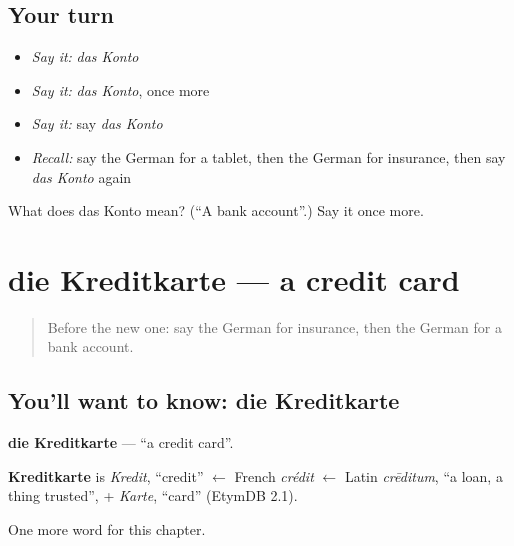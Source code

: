 \subsection*{Your turn}
\begin{itemize}
\raggedright
  \item \emph{Say it:} \emph{das Konto}
  \item \emph{Say it:} \emph{das Konto}, once more
  \item \emph{Say it:} say \emph{das Konto}
  \item \emph{Recall:} say the German for a tablet, then the German for insurance, then say \emph{das Konto} again
\end{itemize}

\begin{tcolorbox}[breakable,colback=teal!4,colframe=teal!35!black,title={Before you move on}]
What does das Konto mean? (\textquotedblleft{}A bank account\textquotedblright{}.) Say it once more.
\end{tcolorbox}
\section[die Kreditkarte]{die Kreditkarte — a credit card}

\label{lesson:GE-C157-kreditkarte}



\begin{quote}
Before the new one: say the German for insurance, then the German for a bank account.
\end{quote}

\subsection*{You'll want to know: die Kreditkarte}
\textbf{die Kreditkarte} — \textquotedblleft{}a credit card\textquotedblright{}.

\begin{cousinweb}
\textbf{Kreditkarte} is \emph{Kredit}, \textquotedblleft{}credit\textquotedblright{} $\leftarrow$ French \emph{crédit} $\leftarrow$ Latin \emph{crēditum}, \textquotedblleft{}a loan, a thing trusted\textquotedblright{}, + \emph{Karte}, \textquotedblleft{}card\textquotedblright{} (EtymDB 2.1).
\end{cousinweb}

\begin{grammarlens}[title={What you've built}]
One more word for this chapter.
\end{grammarlens}

